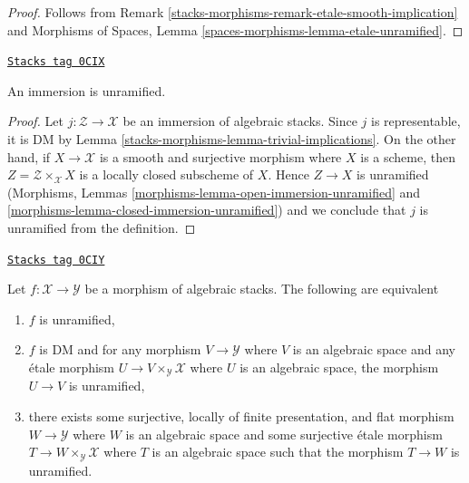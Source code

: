 \begin{proof}
Follows from Remark \ref{stacks-morphisms-remark-etale-smooth-implication}
and Morphisms of Spaces, Lemma
\ref{spaces-morphisms-lemma-etale-unramified}.
\end{proof}

\begin{lemma}
\label{stacks-morphisms-lemma-immersion-unramified}
\href{https://stacks.math.columbia.edu/tag/0CIX}{\texttt{Stacks tag 0CIX}}

An immersion is unramified.
\end{lemma}

\begin{proof}
Let $j : \mathcal{Z} \to \mathcal{X}$ be an immersion of
algebraic stacks. Since $j$ is representable, it is DM by
Lemma \ref{stacks-morphisms-lemma-trivial-implications}. On the other hand,
if $X \to \mathcal{X}$ is a smooth and surjective morphism
where $X$ is a scheme, then $Z = \mathcal{Z} \times_\mathcal{X} X$
is a locally closed subscheme of $X$. Hence $Z \to X$ is unramified
(Morphisms, Lemmas \ref{morphisms-lemma-open-immersion-unramified} and
\ref{morphisms-lemma-closed-immersion-unramified})
and we conclude that $j$ is unramified from the definition.
\end{proof}

\begin{lemma}[Unramified]
\label{stacks-morphisms-lemma-unramified}
\href{https://stacks.math.columbia.edu/tag/0CIY}{\texttt{Stacks tag 0CIY}}

Let $f : \mathcal{X} \to \mathcal{Y}$ be a morphism of algebraic stacks.
The following are equivalent
\begin{enumerate}
\item $f$ is unramified,
\item $f$ is DM and for any morphism $V \to \mathcal{Y}$
where $V$ is an algebraic space and any \'etale morphism
$U \to V \times_\mathcal{Y} \mathcal{X}$ where $U$ is an algebraic space,
the morphism $U \to V$ is unramified,
\item there exists some surjective, locally of finite presentation, and flat
morphism $W \to \mathcal{Y}$ where $W$ is an algebraic space and some
surjective \'etale morphism $T \to W \times_\mathcal{Y} \mathcal{X}$
where $T$ is an algebraic space such that the morphism $T \to W$ is unramified.
\end{enumerate}
\end{lemma}

